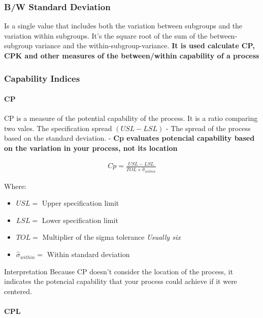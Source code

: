 \documentclass[11pt]{article}
\begin{document}
\hypertarget{bw-standard-deviation}{%
\subsubsection{B/W Standard Deviation}\label{bw-standard-deviation}}

Is a single value that includes both the variation between subgroups and
the variation within subgroups. It's the square root of the sum of the
between-subgroup variance and the within-subgroup-variance. \textbf{It
is used calculate CP, CPK and other measures of the between/within
capability of a process}

\hypertarget{capability-indices}{%
\subsubsection{Capability Indices}\label{capability-indices}}

\hypertarget{cp}{%
\paragraph{CP}\label{cp}}

CP is a measure of the potential capability of the process. It is a
ratio comparing two vales. The specification spread \((USL - LSL)\) - The
spread of the process based on the standard deviation. - \textbf{Cp
evaluates potencial capability based on the variation in your process,
not its location}

\begin{gather}
  Cp = \frac{USL - LSL}{TOL \times \hat{\sigma}_{within}}
\end{gather}

Where: 
\begin{itemize}
  \item \(USL =\) Upper specification limit
  \item \(LSL =\) Lower specification limit
  \item \(TOL =\) Multiplier of the sigma tolerance \emph{Usually six}
  \item \(\hat{\sigma}_{within} =\) Within  standard deviation
\end{itemize}

Interpretation Because CP doesn't consider the location of the process,
it indicates the potencial capability that your process could achieve if
it were centered.

\hypertarget{cpl}{%
\paragraph{CPL}\label{cpl}}
\end{document}
